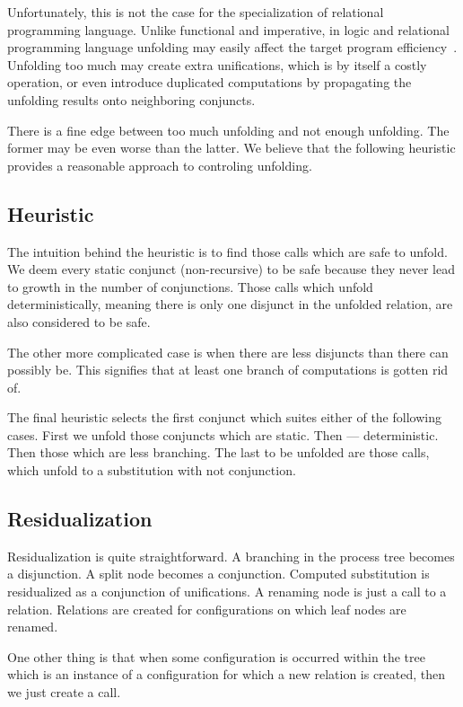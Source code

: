 Unfortunately, this is not the case for the specialization of relational programming language.
Unlike functional and imperative, in logic and relational programming language unfolding may easily affect the target program efficiency~\cite{leuschel2002logic}.
Unfolding too much may create extra unifications, which is by itself a costly operation, or even introduce duplicated computations by propagating the unfolding results onto neighboring conjuncts.

There is a fine edge between too much unfolding and not enough unfolding.
The former may be even worse than the latter.
We believe that the following heuristic provides a reasonable approach to controling unfolding.

\subsection{Heuristic}

The intuition behind the heuristic is to find those calls which are safe to unfold.
We deem every static conjunct (non-recursive) to be safe because they never lead to growth in the number of conjunctions.
Those calls which unfold deterministically, meaning there is only one disjunct in the unfolded relation, are also considered to be safe.

The other more complicated case is when there are less disjuncts than there can possibly be.
This signifies that at least one branch of computations is gotten rid of.

The final heuristic selects the first conjunct which suites either of the following cases.
First we unfold those conjuncts which are static.
Then --- deterministic.
Then those which are less branching.
The last to be unfolded are those calls, which unfold to a substitution with not conjunction.

\subsection{Residualization}

Residualization is quite straightforward.
A branching in the process tree becomes a disjunction.
A split node becomes a conjunction.
Computed substitution is residualized as a conjunction of unifications.
A renaming node is just a call to a relation.
Relations are created for configurations on which leaf nodes are renamed.

One other thing is that when some configuration is occurred within the tree which is an instance of a configuration for which a new relation is created, then we just create a call.
